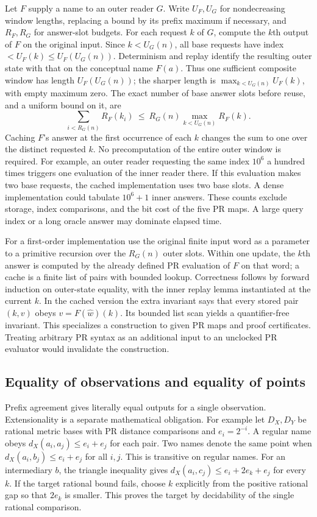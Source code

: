 Let $F$ supply a name to an outer reader $G$. Write $U_F,U_G$ for
nondecreasing window lengths, replacing a bound by its prefix maximum if
necessary, and $R_F,R_G$ for answer-slot budgets. For each request $k$ of
$G$, compute the $k$th output of $F$ on the original input. Since
$k<U_G(n)$, all base requests have index
$<U_F(k)\le U_F(U_G(n))$. Determinism and replay identify the resulting
outer state with that on the conceptual name $F(a)$. Thus one sufficient
composite window has length $U_F(U_G(n))$; the sharper length is
$\max_{k<U_G(n)}U_F(k)$, with empty maximum zero. The exact number of
base answer slots before reuse, and a uniform bound on it, are
\[
 \sum_{i<R_G(n)} R_F(k_i)
 \ \le\ R_G(n)\max_{k<U_G(n)} R_F(k).
\]
Caching $F$'s answer at the first occurrence of each $k$ changes the sum
to one over the distinct requested $k$. No precomputation of the entire
outer window is required. For example, an outer reader requesting the
same index $10^6$ a hundred times triggers one evaluation of the inner
reader there. If this evaluation makes two base requests, the cached
implementation uses two base slots. A dense implementation could tabulate
$10^6+1$ inner answers. These counts exclude storage, index comparisons,
and the bit cost of the five PR maps. A large query index or a long oracle
answer may dominate elapsed time.

For a first-order implementation use the original finite input word as a
parameter to a primitive recursion over the $R_G(n)$ outer slots. Within
one update, the $k$th answer is computed by the already defined PR evaluation
of $F$ on that word; a cache is a finite list of pairs with bounded lookup.
Correctness follows by forward induction on outer-state equality, with the
inner replay lemma instantiated at the current $k$. In the cached version
the extra invariant says that every stored pair
$(k,v)$ obeys $v=F(\widehat w)(k)$. Its bounded list scan yields a
quantifier-free invariant. This specializes a construction to given PR
maps and proof certificates. Treating arbitrary PR syntax as an additional
input to an unclocked PR evaluator would invalidate the construction.

\subsection{Equality of observations and equality of points}

Prefix agreement gives literally equal outputs for a single observation.
Extensionality is a separate mathematical obligation. For example let
$D_X,D_Y$ be rational metric bases with PR distance comparisons and
$e_i=2^{-i}$. A regular name obeys
$d_X(a_i,a_j)\le e_i+e_j$ for each pair. Two names denote the same point
when $d_X(a_i,b_j)\le e_i+e_j$ for all $i,j$. This is transitive on
regular names. For an intermediary $b$, the triangle inequality gives
$d_X(a_i,c_j)\le e_i+2e_k+e_j$ for every $k$. If the target rational
bound fails, choose $k$ explicitly from the positive rational gap so that
$2e_k$ is smaller. This proves the target by decidability of the single
rational comparison.


